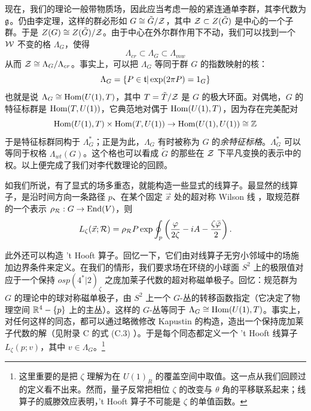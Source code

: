 现在，我们的理论一般带物质场，因此应当考虑一般的紧连通单李群，其李代数为 $\mathfrak{g}$。仍由李定理，这样的群必形如 $G\cong \tilde G/\mathcal{Z}$，其中 $\mathcal{Z}\subset Z(\tilde G)$ 是中心的一个子群。于是 $Z(G) \cong Z(\tilde G)/\mathcal{Z}$。由于中心在外尔群作用下不动，我们可以找到一个 $\mathcal{W}$ 不变的格 $\Lambda_G$，使得
\begin{equation}
 \Lambda_{cr}\subset \Lambda_G \subset \Lambda_{mw}
 \end{equation}
从而 $\mathcal{Z} \cong  \Lambda_G/\Lambda_{cr} $。事实上，可以把 $\Lambda_G$ 等同于群 $G$ 的指数映射的核：
\begin{equation}
\Lambda_G = \{ P \in \mathfrak{t} \vert \exp(2\pi P) = 1_G \}
\end{equation}
也就是说 $\Lambda_G \cong {\rm Hom}(U(1), T)$，其中 $T= \tilde T/\mathcal{Z}$ 是 $G$ 的极大环面。对偶地，$G$ 的特征标群是 ${\rm Hom}(T, U(1))$，它典范地对偶于 ${\rm Hom}(U(1),T)$，因为存在完美配对
\begin{equation}
{\rm Hom}(U(1),T) \times {\rm Hom}(T,U(1)) \rightarrow {\rm
Hom}(U(1),U(1))\cong \mathbb{Z}
\end{equation}
于是特征标群同构于 $\Lambda_G^*$；正是为此，$\Lambda_G$ 有时被称为 $G$ 的\emph{余特征标格}。$\Lambda_G^*$ 可以等同于权格 $\Lambda_{wt}(G)$。这个格也可以看成 $\tilde G$ 的那些在 $\mathcal{Z}$ 下平凡变换的表示中的权。以上便完成了我们对李代数理论的回顾。

如我们所说，有了显式的场多重态，就能构造一些显式的线算子。最显然的线算子，是沿时间方向一条路径 $p$、在某个固定 $\vec x$ 处的超对称 Wilson 线 \cite{Baulieu:1997nj,Maldacena:1998im,Rey:1998ik}，取规范群的一个表示 $\rho_{\mathcal{R}}: G\to {\rm End}(V)$，则
\begin{equation}\label{eq:Susy-Wilson-Zeta}
L_\zeta(\vec x ;\mathcal{R}) =
\rho_{\mathcal{R}} P\exp \oint_{p} \left( \frac{\varphi}{2\zeta } - i A
- \frac{\zeta \bar \varphi}{2 }  \right).
\end{equation}

此外还可以构造 't Hooft 算子。回忆一下，它们由对线算子无穷小邻域中的场施加边界条件来定义。在我们的情形，我们要求场在环绕的小球面 $S^2$ 上的极限值对应于一个保持 $osp(4^*\vert 2)_\zeta$ 之庞加莱子代数的超对称磁单极子。回忆：规范群为 $G$ 的理论中的球对称磁单极子，由 $S^2$ 上一个 $G$-丛的转移函数指定（它决定了物理空间 $\mathbb{R}^4-\{p\}$ 上的主丛）。这样的 $G$-丛等同于 $\Lambda_G \cong {\rm Hom}(U(1),T)$。事实上，对任何这样的同态，都可以通过略微修改 Kapustin 的构造，造出一个保持庞加莱子代数的解（见附录 C%
的式 (C.3)%
）。于是每个同态都定义一个 't Hooft 线算子 $L_\zeta (p;v)$，其中 $v \in \Lambda_G$。\footnote{这里重要的是把 $\zeta$ 理解为在 $U(1)_R$ 的覆盖空间中取值。这一点从我们回顾过的定义看不出来。然而，量子反常把相位 $\zeta$ 的改变与 $\theta$ 角的平移联系起来；线算子的威滕效应表明，'t Hooft 算子不可能是 $\zeta$ 的单值函数。}

